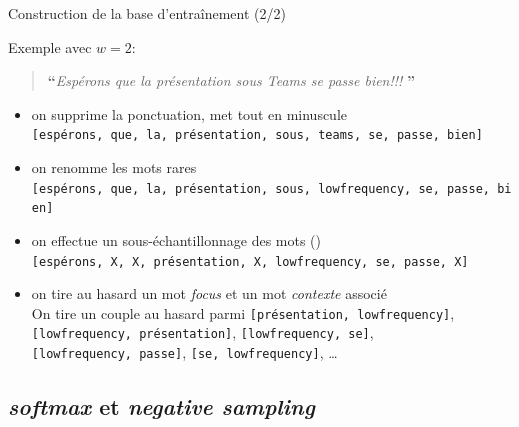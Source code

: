 \documentclass[10pt,xcolor=table,color={dvipsnames,usenames},ignorenonframetext,usepdftitle=false,french]{beamer}
\begin{document}
\begin{frame}[fragile]{Construction de la base d'entraînement (2/2)}
\protect\hypertarget{construction-de-la-base-dentrauxeenement-22}{}

Exemple avec \(w=2\):

\begin{quote}
\LARGE \textbf{``}\normalsize \emph{Espérons que la présentation sous Teams se passe bien!!!} \LARGE \textbf{''}\normalsize
\end{quote}

\begin{itemize}
\item
  on supprime la ponctuation, met tout en minuscule\\
  \faArrowCircleRight{}
  \texttt{{[}espérons,\ que,\ la,\ présentation,\ sous,\ teams,\ se,\ passe,\ bien{]}}
\item
  on renomme les mots rares\\
  \faArrowCircleRight{}
  \texttt{{[}espérons,\ que,\ la,\ présentation,\ sous,\ lowfrequency,\ se,\ passe,\ bien{]}}
  \pause
\item
  on effectue un sous-échantillonnage des mots
  ()\\
  \faArrowCircleRight{}
  \texttt{{[}espérons,\ X,\ X,\ présentation,\ X,\ lowfrequency,\ se,\ passe,\ X{]}}
  \pause
\item
  on tire au hasard un mot \emph{focus} et un mot \emph{contexte}
  associé\\
  \faArrowCircleRight{} On tire un couple au hasard parmi
  \texttt{{[}présentation,\ lowfrequency{]}},
  \texttt{{[}lowfrequency,\ présentation{]}},
  \texttt{{[}lowfrequency,\ se{]}}, \texttt{{[}lowfrequency,\ passe{]}},
  \texttt{{[}se,\ lowfrequency{]}}, \dots
\end{itemize}

\end{frame}

\hypertarget{softmax-et-negative-sampling}{%
\subsection{\texorpdfstring{\emph{softmax} et \emph{negative
sampling}}{softmax et negative sampling}}\label{softmax-et-negative-sampling}}
\end{document}
